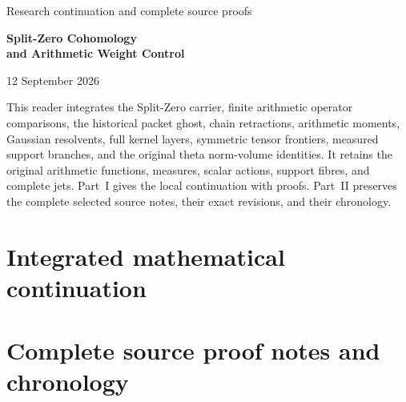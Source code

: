 \documentclass[11pt,a4paper]{article}
\theoremstyle{definition}
\theoremstyle{remark}
\begin{document}
\begin{titlepage}
\centering
\vspace*{25mm}
{\Large Research continuation and complete source proofs\par}
\vspace{12mm}
{\Huge\bfseries Split-Zero Cohomology\\[5mm]and Arithmetic Weight Control\par}
\vspace{15mm}
{\Large 12 September 2026\par}
\vfill
\begin{minipage}{0.87\textwidth}
This reader integrates the Split-Zero carrier, finite arithmetic operator
comparisons, the historical packet ghost, chain retractions, arithmetic
moments, Gaussian resolvents, full kernel layers, symmetric tensor frontiers,
measured support branches, and the original theta norm-volume identities.
It retains the original arithmetic
functions, measures, scalar actions, support fibres, and complete jets.
Part~I gives the local continuation with proofs. Part~II preserves the
complete selected source notes, their exact revisions, and their chronology.
\end{minipage}
\vspace{22mm}
\end{titlepage}
\tableofcontents
\clearpage
\part{Integrated mathematical continuation}






















\clearpage
\part{Complete source proof notes and chronology}
\appendix
\sloppy

\end{document}
